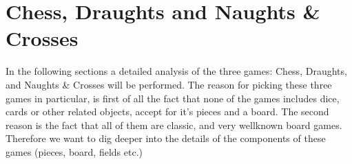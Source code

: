 \section{Chess, Draughts and Naughts \& Crosses}

In the following sections a detailed analysis of the three games: Chess, Draughts, and Naughts \& Crosses will be performed. The reason for picking these three games in particular, is first of all the fact that none of the games includes dice, cards or other related objects, accept for it's pieces and a board. The second reason is the fact that all of them are classic, and very wellknown board games. Therefore we want to dig deeper into the details of the components of these games (pieces, board, fields etc.)      